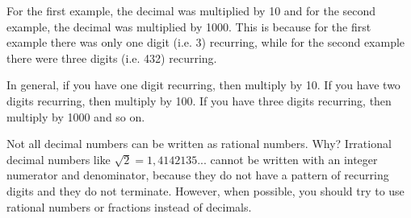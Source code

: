       \label{m38348*id64459}For the first example, the decimal was multiplied by 10 and for the second example, the decimal was multiplied by 1000. This is because for the first example there was only one digit (i.e. 3) recurring, while for the second example there were three digits (i.e. 432) recurring.\par 
      \label{m38348*id64465}In general, if you have one digit recurring, then multiply by 10. If you have two digits recurring, then multiply by 100. If you have three digits recurring, then multiply by 1000 and so on.\par

      \label{m38348*id64474}Not all decimal numbers can be written as rational numbers. Why? Irrational decimal numbers like 
$\sqrt{2}=1,4142135...$
cannot be written with an integer numerator and denominator, because they do not have a pattern of recurring digits and they do not terminate. However, when possible, you should try to use rational numbers or fractions instead of decimals.




